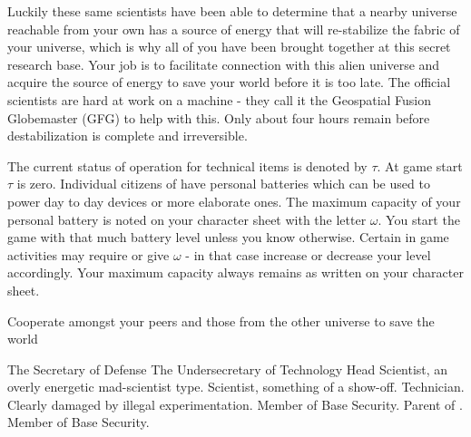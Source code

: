 \documentclass[blue]{guildcamp3}
\begin{document}
Luckily these same scientists have been able to determine that a nearby universe reachable from your own has a source of energy that will re-stabilize the fabric of your universe, which is why all of you have been brought together at this secret research base. Your job is to facilitate connection with this alien universe and acquire the source of energy to save your world before it is too late. The official scientists are hard at work on a machine - they call it the Geospatial Fusion Globemaster (GFG) to help with this. Only about four hours remain before destabilization is complete and irreversible.

The current status of operation for technical items is denoted by $\tau$. At game start $\tau$ is zero. Individual citizens of \bTechWorld{} have personal batteries which can be used to power day to day devices or more elaborate ones. The maximum capacity of your personal battery is noted on your character sheet with the letter $\omega$. You start the game with that much battery level unless you know otherwise. Certain in game activities may require or give $\omega$ - in that case increase or decrease your level accordingly. Your maximum capacity always remains as written on your character sheet. 

\begin{itemz}[Goals]
	\item Cooperate amongst your peers and those from the other universe to save the world
\end{itemz}


\begin{members}
	\member{\cPoliOne{}} The Secretary of Defense
	\member{\cPoliTwo{}} The Undersecretary of Technology
	\member{\cSciOne{}} Head Scientist, an overly energetic mad-scientist type.
	\member{\cSciTwo{}} Scientist, something of a show-off.
	\member{\cTech{}} Technician. Clearly damaged by illegal experimentation.
	\member{\cSpecOpOne{}} Member of Base Security. Parent of \cSciOne{}.
	\member{\cSpecOpTwo{}} Member of Base Security.
\end{members}
\end{document}
